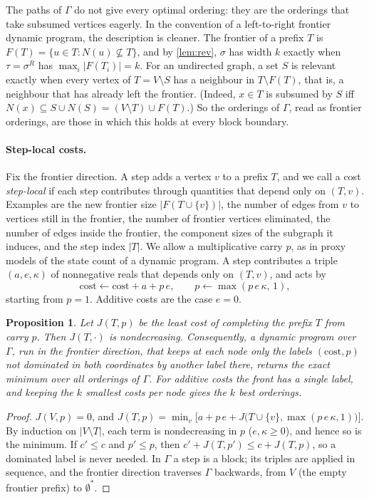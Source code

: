\documentclass[11pt]{article}
\newtheorem{proposition}[theorem]{Proposition}
\theoremstyle{definition}
\newcommand{\set}[1]{\{#1\}}
\begin{document}
The paths of $\Gamma$ do not give every optimal ordering: they are the
orderings that take subsumed vertices eagerly. In the convention of a
left-to-right frontier dynamic program, the description is cleaner. The
frontier of a prefix $T$ is $F(T)=\set{u\in T:N(u)\not\subseteq T}$, and by
\cref{lem:rev}, $\sigma$ has width $k$ exactly when $\tau=\sigma^R$ has
$\max_i|F(T_i)|=k$. For an undirected graph, a set $S$ is relevant exactly
when every vertex of $T=V\setminus S$ has a neighbour in $T\setminus F(T)$,
that is, a neighbour that has already left the frontier. (Indeed, $x\in T$
is subsumed by $S$ iff $N(x)\subseteq S\cup N(S)=(V\setminus T)\cup F(T)$.)
So the orderings of $\Gamma$, read as frontier orderings, are those
in which this holds at every block boundary.

\paragraph{Step-local costs.}
Fix the frontier direction. A step adds a vertex $v$ to a prefix $T$, and
we call a cost \emph{step-local} if each step contributes through
quantities that depend only on $(T,v)$. Examples are the new frontier size
$|F(T\cup\set v)|$, the number of edges from $v$ to vertices still in the
frontier, the number of frontier vertices eliminated, the number of edges
inside the frontier, the component sizes of the subgraph it induces, and
the step index $|T|$. We allow a multiplicative carry $p$, as in proxy
models of the state count of a dynamic program. A step contributes a triple
$(a,e,\kappa)$ of nonnegative reals that depends only on $(T,v)$, and acts
by
\[
\text{cost}\gets\text{cost}+a+p\,e,\qquad p\gets\max(p\,e\,\kappa,\,1),
\]
starting from $p=1$. Additive costs are the case $e=0$.

\begin{proposition}\label{prop:pareto}
Let $J(T,p)$ be the least cost of completing the prefix $T$ from carry $p$.
Then $J(T,\cdot)$ is nondecreasing. Consequently, a dynamic program over
$\Gamma$, run in the frontier direction, that keeps at each node only the
labels $(\text{cost},p)$ not dominated in both coordinates by another label
there, returns the exact minimum over all orderings of $\Gamma$. For
additive costs the front has a single label, and keeping the $k$ smallest
costs per node gives the $k$ best orderings.
\end{proposition}
\begin{proof}
$J(V,p)=0$, and
$J(T,p)=\min_{v}\bigl[a+p\,e+J\bigl(T\cup\set v,\max(p\,e\,\kappa,1)\bigr)\bigr]$.
By induction on $|V\setminus T|$, each term is nondecreasing in $p$
($e,\kappa\ge0$), and hence so is the minimum. If $c'\le c$ and $p'\le p$,
then $c'+J(T,p')\le c+J(T,p)$, so a dominated label is never needed. In
$\Gamma$ a step is a block; its triples are applied in sequence, and the
frontier direction traverses $\Gamma$ backwards, from $V$ (the empty
frontier prefix) to $\emptyset^*$.
\end{proof}
\end{document}
